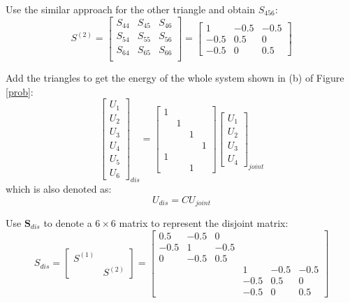 \documentclass[a4paper,titlepage]{article}
\begin{document}
		Use the similar approach for the other triangle and obtain $S_{456}$:
		$$
			S^{(2)} = \begin{bmatrix}
				S_{44} & S_{45} & S_{46}\\
				S_{54} & S_{55} & S_{56} \\
				S_{64} & S_{65} & S_{66} \\
			\end{bmatrix} = 
			\begin{bmatrix}
				1 & -0.5 & -0.5\\
				-0.5 & 0.5 & 0 \\
				-0.5 & 0 & 0.5
			\end{bmatrix}
		$$
		
		Add the triangles to get the energy of the whole system shown in (b) of Figure \ref{prob}:
		$$
			\begin{bmatrix}
				U_1 \\
				U_2 \\
				U_3 \\
				U_4 \\
				U_5 \\
				U_6				
			\end{bmatrix}_{dis} = 
			\begin{bmatrix}
				1&&&\\
				&1&&\\
				&&1&\\
				&&&1\\
				1&&&\\
				&&1&
			\end{bmatrix}
			\begin{bmatrix}
				U_1 \\
				U_2 \\
				U_3 \\
				U_4
			\end{bmatrix}_{joint}
		$$
		which is also denoted as:
		$$
			U_{dis} = CU_{joint}
		$$
		
		Use $\textbf{S}_{dis}$ to denote a $6\times 6$ matrix to represent the disjoint matrix:
		$$
			S_{dis} = 
			\begin{bmatrix}
				S^{(1)} & \\
				 & S^{(2)}				
			\end{bmatrix} = 
			\begin{bmatrix}
				0.5 & -0.5 & 0 & & & \\
				-0.5 & 1 & -0.5 & & & \\
				0 & -0.5 & 0.5 & & & \\
				& & & 1 & -0.5 & -0.5 \\
				& & & -0.5 & 0.5 & 0 \\
				& & & -0.5 & 0 & 0.5
			\end{bmatrix}
		$$
		
\end{document}
